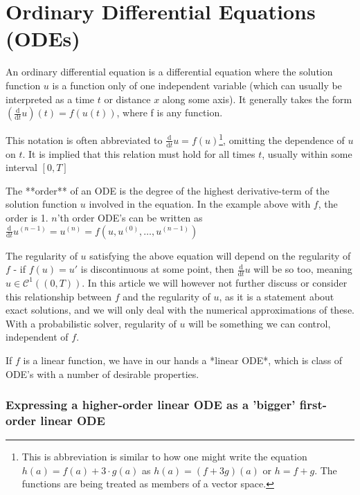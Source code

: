 \ifdefined\COMPILINGFROMMAIN
\else
    
    
\fi


\section*{Ordinary Differential Equations (ODEs)}

An ordinary differential equation is a differential equation where the solution function $u$ is a function only of one independent variable (which can usually be interpreted as a time $t$ or distance $x$ along some axis). It generally takes the form $(\frac{\text{d}}{\text{d}t}u)(t) = f(u(t))$, where f is any function. 


This notation is often abbreviated to $\frac{\text{d}}{\text{d}t}u = f(u)$\footnote{This is abbreviation is similar to how one might write the equation $h(a) = f(a) + 3\cdot g(a)$ as $h(a) = (f+3g)(a)$ or $h = f+g$. The functions are being treated as members of a vector space.}, omitting the dependence of $u$ on $t$. It is implied that this relation must hold for all times $t$, usually within some interval $[0, T]$

The **order** of an ODE is the degree of the highest derivative-term of the solution function $u$ involved in the equation. In the example above with $f$, the order is 1. $n$'th order ODE's can be written as $\frac{\text{d}}{\text{d}t}u^{(n-1)} = u^{(n)} = f(u, u^{(0)}, \dots, u^{(n-1)})$

The regularity of $u$ satisfying the above equation will depend on the regularity of $f$ - if $f(u)=u'$ is discontinuous at some point, then $\frac{\text{d}}{\text{d}t}u$ will be so too, meaning $u \in \mathcal{C}^1((0, T))$. In this article we will however not further discuss or consider this relationship between $f$ and the regularity of $u$, as it is a statement about exact solutions, and we will only deal with the numerical approximations of these. With a probabilistic solver, regularity of $u$ will be something we can control, independent of $f$.

If $f$ is a linear function, we have in our hands a *linear ODE*, which is class of ODE's with a number of desirable properties.

\subsubsection*{Expressing a higher-order linear ODE as a 'bigger' first-order linear ODE}

